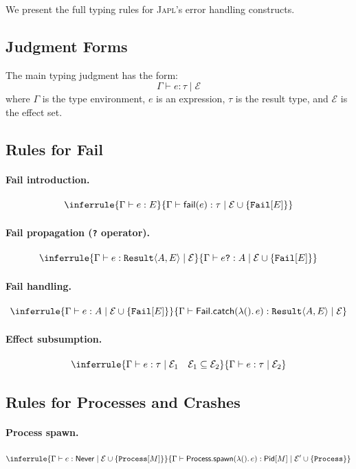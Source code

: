\documentclass[11pt,twocolumn]{article}
\newcommand{\japl}{\textsc{Japl}}
\newcommand{\Result}{\texttt{Result}}
\newcommand{\Eff}{\mathcal{E}}
\begin{document}
We present the full typing rules for \japl{}'s error handling constructs.

\subsection{Judgment Forms}

The main typing judgment has the form:
\[
  \Gamma \vdash e : \tau \mid \Eff
\]
where $\Gamma$ is the type environment, $e$ is an expression, $\tau$ is the result type, and $\Eff$ is the effect set.

\subsection{Rules for Fail}

\paragraph{Fail introduction.}
\[
  \inferrule
    {\Gamma \vdash e : E}
    {\Gamma \vdash \mathsf{fail}(e) : \tau \mid \Eff \cup \{\texttt{Fail}[E]\}}
\]

\paragraph{Fail propagation (\texttt{?} operator).}
\[
  \inferrule
    {\Gamma \vdash e : \Result\langle A, E\rangle \mid \Eff}
    {\Gamma \vdash e\texttt{?} : A \mid \Eff \cup \{\texttt{Fail}[E]\}}
\]

\paragraph{Fail handling.}
\[
  \inferrule
    {\Gamma \vdash e : A \mid \Eff \cup \{\texttt{Fail}[E]\}}
    {\Gamma \vdash \mathsf{Fail.catch}(\lambda().\, e) : \Result\langle A, E\rangle \mid \Eff}
\]

\paragraph{Effect subsumption.}
\[
  \inferrule
    {\Gamma \vdash e : \tau \mid \Eff_1 \quad \Eff_1 \subseteq \Eff_2}
    {\Gamma \vdash e : \tau \mid \Eff_2}
\]

\subsection{Rules for Processes and Crashes}

\paragraph{Process spawn.}
\[
  \inferrule
    {\Gamma \vdash e : \mathsf{Never} \mid \Eff \cup \{\texttt{Process}[M]\}}
    {\Gamma \vdash \mathsf{Process.spawn}(\lambda().\, e) : \mathsf{Pid}[M] \mid \Eff' \cup \{\texttt{Process}\}}
\]
\end{document}
